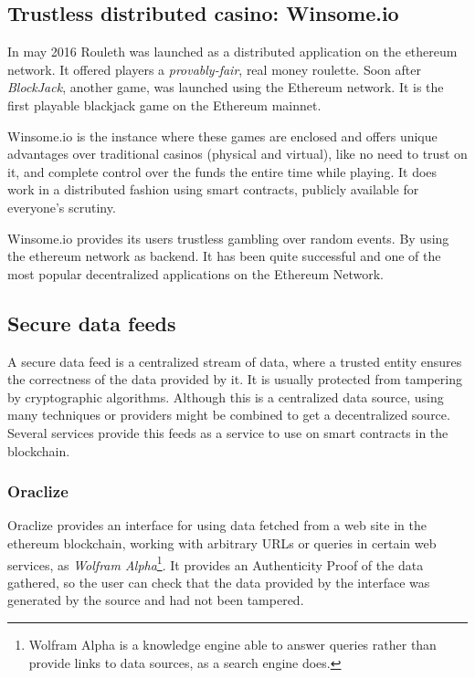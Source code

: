 \subsection{Trustless distributed casino: Winsome.io}

In may 2016 Rouleth \cite{winsomeio} was launched as a distributed application
  on the ethereum network.
It offered players a \textit{provably-fair}, real money roulette.
Soon after \textit{BlockJack}, another game,  was launched using the Ethereum
  network.
It is the first playable blackjack game on the Ethereum mainnet.

Winsome.io is the instance where these games are enclosed and offers unique
  advantages over traditional casinos (physical and virtual), like no need to
  trust on it, and complete control over the funds the entire time while
  playing.
It does work in a distributed fashion using smart contracts, publicly available
  for everyone's scrutiny.

Winsome.io provides its users trustless gambling over random events.
By using the ethereum network as backend.
It has been quite successful and one of the most popular decentralized
  applications on the Ethereum Network.

\subsection{Secure data feeds}
A secure data feed is a centralized stream of data, where a trusted entity
  ensures the correctness of the data provided by it.
It is usually protected from tampering by cryptographic algorithms.
Although this is a centralized data source, using many techniques or providers
  might be combined to get a decentralized source.
Several services provide this feeds as a service to use on smart contracts in
  the blockchain.

\subsubsection{Oraclize}
Oraclize \cite{oraclizeit} provides an interface for using data fetched from a
  web site in the ethereum blockchain, working with arbitrary URLs or queries
  in certain web services, as \textit{Wolfram Alpha}\footnote{Wolfram Alpha is a
  knowledge engine able to answer queries rather than provide links to data
  sources, as a search engine does.}.
It provides an Authenticity Proof of the data gathered, so the user can check
  that the data provided by the interface was generated by the source and had
  not been tampered.

